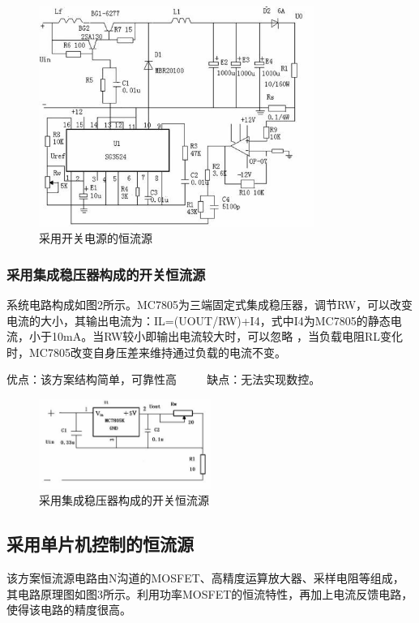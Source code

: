 \documentclass{../source/zjureport}
\begin{document}
            \begin{figure}[thp]
                \centering
                \includegraphics[width = 0.8\textwidth]{figure/采用开关电路的恒流源.jpg}
                \caption{采用开关电源的恒流源}
            \end{figure}

            \subsubsection{采用集成稳压器构成的开关恒流源}
            系统电路构成如图2所示。MC7805为三端固定式集成稳压器，调节RW，可以改变电流的大小，其输出电流为：IL=(UOUT/RW)+I4，式中I4为MC7805的静态电流，小于10mA。当RW较小即输出电流较大时，可以忽略 ，当负载电阻RL变化时，MC7805改变自身压差来维持通过负载的电流不变。

            优点：该方案结构简单，可靠性高
　　
            缺点：无法实现数控。

            \begin{figure}[thp]
                \centering
                \includegraphics[width = 0.5\textwidth]{figure/采用集成稳压器的开关恒流源.jpg}
                \caption{采用集成稳压器构成的开关恒流源}
            \end{figure}

            \subsection{采用单片机控制的恒流源}
            该方案恒流源电路由N沟道的MOSFET、高精度运算放大器、采样电阻等组成，其电路原理图如图3所示。利用功率MOSFET的恒流特性，再加上电流反馈电路，使得该电路的精度很高。
\end{document}
